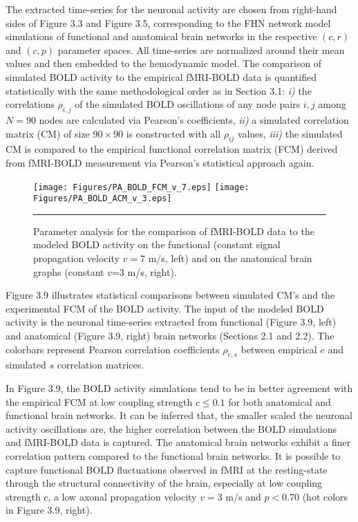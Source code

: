 The extracted time-series for the neuronal activity are chosen from right-hand sides of Figure 3.3 and Figure 3.5, corresponding to the FHN network model simulations of functional and anatomical brain networks in the respective $(c,r)$ and $(c,p)$ parameter spaces. All time-series are normalized around their mean values and then embedded to the hemodynamic model. The comparison of simulated BOLD activity to the empirical fMRI-BOLD data is quantified statistically with the same methodological order as in Section 3.1: \textit{i)} the correlations $\rho_{i,j}$ of the simulated BOLD oscillations of any node pairs $i,j$ among $N=90$ nodes are calculated via Pearson's coefficients, \textit{ii)} a simulated correlation matrix (CM) of size $90 \times 90$ is constructed with all $\rho_{ij}$ values, \textit{iii)} the simulated CM is compared to the empirical functional correlation matrix (FCM) derived from fMRI-BOLD measurement via Pearson's statistical approach again.    


\begin{figure}[htbp]
 
  \centering
    \texttt{[image: Figures/PA\_BOLD\_FCM\_v\_7.eps]} 
	\texttt{[image: Figures/PA\_BOLD\_ACM\_v\_3.eps]} 

	
    \rule{35em}{0.5pt}
  \caption[Parameter Analysis, BOLD]{Parameter analysis for the comparison of fMRI-BOLD data to the modeled BOLD activity on the functional (constant signal propagation velocity $v=7$ m/s, left) and on the anatomical brain graphs (constant $v$=3 m/s, right). }
  \label{fig:Parameter Analysis, BOLD}
 	
\end{figure} 

Figure 3.9 illustrates statistical comparisons between simulated CM's and  the experimental FCM of the BOLD activity. The input of the modeled BOLD activity is the neuronal time-series extracted from functional (Figure 3.9, left) and anatomical (Figure 3.9, right) brain networks (Sections 2.1 and 2.2). The colorbars represent Pearson correlation coefficients $\rho_{e,s}$ between empirical $e$ and simulated $s$ correlation matrices. 

In Figure 3.9, the BOLD activity simulations tend to be in better agreement with the empirical FCM at low coupling strength $c \leq 0.1$ for both anatomical and functional brain networks. It can be inferred that, the smaller scaled the neuronal activity oscillations are, the higher correlation between the BOLD simulations and fMRI-BOLD data is captured. The anatomical brain networks exhibit a finer correlation pattern compared to the functional brain networks. It is possible to capture functional BOLD fluctuations observed in fMRI at the resting-state through the structural connectivity of the brain, especially at low coupling strength $c$, a low axonal propagation velocity $v=3$ m/s and $p<0.70$ (hot colors in Figure 3.9, right). 

